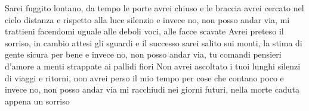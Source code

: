 \beginverse
Sarei fuggito lontano,
da tempo le porte avrei chiuso
e le braccia avrei cercato nel cielo
distanza e rispetto alla luce silenzio
e invece no, non posso andar via,
mi trattieni facendomi uguale alle deboli voci,
alle facce scavate
Avrei preteso il sorriso,
in cambio attesi gli sguardi e il successo
sarei salito sui monti,
la stima di gente sicura per bene
e invece no, non posso andar via,
tu comandi pensieri d'amore
a menti strappate ai pallidi fiori
Non avrei ascoltato i tuoi lunghi silenzi
di viaggi e ritorni,
non avrei perso il mio tempo
per cose che contano poco
e invece no, non posso andar via
mi racchiudi nei giorni futuri,
nella morte caduta appena un sorriso
\endverse
\endsong
